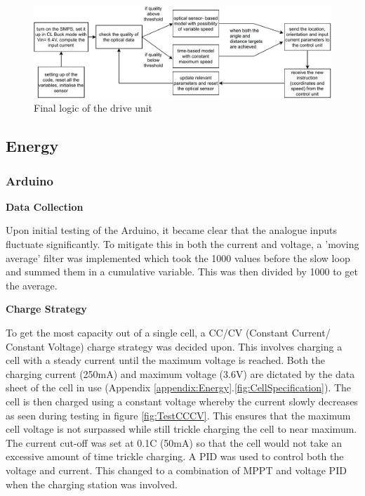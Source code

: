 \documentclass[10pt,twoside]{article}
\begin{document}
\begin{figure}[hbt]
    \centering
    \includegraphics[width = \textwidth]{driveunit_structure.pdf}
    \caption{Final logic of the drive unit}
    \label{figure}
\end{figure}


\subsection{Energy}
\newpage
\subsubsection{Arduino}

\textbf{Data Collection}

Upon initial testing of the Arduino, it became clear that the analogue inputs fluctuate significantly. To mitigate this in both the current and voltage, a 'moving average' filter was implemented which took the 1000 values before the slow loop and summed them in a cumulative variable. This was then divided by 1000 to get the average.

\textbf{Charge Strategy}

To get the most capacity out of a single cell, a CC/CV (Constant Current/ Constant Voltage) charge strategy was decided upon. This involves charging a cell with a steady current until the maximum voltage is reached. Both the charging current (250mA) and maximum voltage (3.6V) are dictated by the data sheet of the cell in use (Appendix \ref{appendix:Energy}.\ref{fig:CellSpecification}). The cell is then charged using a constant voltage whereby the current slowly decreases as seen during testing in figure \ref{fig:TestCCCV}. This ensures that the maximum cell voltage is not surpassed while still trickle charging the cell to near maximum. The current cut-off was set at 0.1C (50mA) so that the cell would not take an excessive amount of time trickle charging. A PID was used to control both the voltage and current. This changed to a combination of MPPT and voltage PID when the charging station was involved. 
\end{document}
